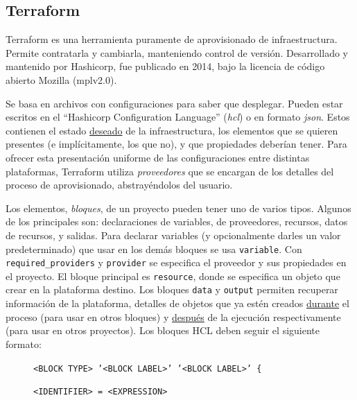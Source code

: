 \documentclass[11pt]{article}
\begin{document}
\begin{flushleft}
\clearpage
\section{Terraform}
Terraform es una herramienta puramente de aprovisionado de infraestructura. Permite contratarla y cambiarla, manteniendo control de versión. Desarrollado y mantenido por Hashicorp, fue publicado en 2014, bajo la licencia de código abierto Mozilla (\acrshort{mpl}v2.0). 
\linebreak

Se basa en archivos con configuraciones para saber que desplegar. Pueden estar escritos en el ``Hashicorp Configuration Language'' (\textit{\acrshort{hcl}}) o en formato \textit{\acrshort{json}}. Estos contienen el estado \underline{deseado} de la infraestructura, los elementos que se quieren presentes (e implícitamente, los que no), y que propiedades deberían tener. Para ofrecer esta presentación uniforme de las configuraciones entre distintas plataformas, Terraform utiliza \textit{proveedores} que se encargan de los detalles del proceso de aprovisionado, abstrayéndolos del usuario.
\linebreak


Los elementos, \textit{bloques}, de un proyecto pueden tener uno de varios tipos. Algunos de los principales son: declaraciones de variables, de proveedores, recursos, datos de recursos, y salidas. Para declarar variables (y opcionalmente darles un valor predeterminado) que usar en los demás bloques se usa \texttt{variable}. Con \texttt{required\_providers} y \texttt{provider} se especifica el proveedor y sus propiedades en el proyecto. El bloque principal es \texttt{resource}, donde se especifica un objeto que crear en la plataforma destino. Los bloques \texttt{data} y \texttt{output} permiten recuperar información de la plataforma, detalles de objetos que ya estén creados \underline{durante} el proceso (para usar en otros bloques) y \underline{después} de la ejecución respectivamente (para usar en otros proyectos). Los bloques HCL deben seguir el siguiente formato:
\linebreak

	\begin{figure}[htb]
		\footnotesize
		\hspace{3.5cm}
		\texttt{<BLOCK TYPE>\ '<BLOCK LABEL>' '<BLOCK LABEL>' \{} 
		
		\hspace{4.5cm}
		\texttt{\color{gray}{\# Block body}}
		
		\hspace{4.5cm}
		\texttt{<IDENTIFIER>\ =\ <EXPRESSION>\ \color{gray}{\# Argument}} 


\end{figure}
\end{flushleft}
\end{document}
